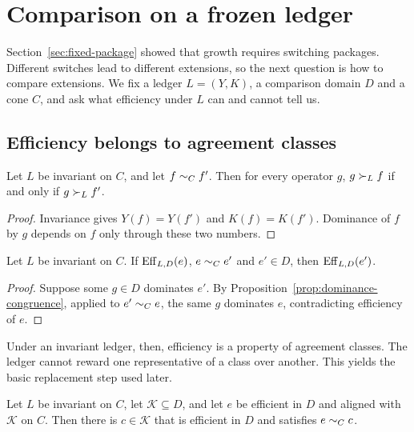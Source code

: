 \section{Comparison on a frozen ledger}\label{sec:frozen-frontier}

Section~\ref{sec:fixed-package} showed that growth requires switching packages. Different switches lead to different extensions, so the next question is how to compare extensions. We fix a ledger $L=(Y,K)$, a comparison domain $D$ and a cone $C$, and ask what efficiency under $L$ can and cannot tell us.

\subsection{Efficiency belongs to agreement classes}

\begin{proposition}\label{prop:dominance-congruence}
Let $L$ be invariant on $C$, and let $f\mathrel{\sim_{C}}f'$. Then for every operator $g$, $g\succ_L f$ if and only if $g\succ_L f'$.
\end{proposition}

\begin{proof}
Invariance gives $Y(f)=Y(f')$ and $K(f)=K(f')$. Dominance of $f$ by $g$ depends on $f$ only through these two numbers.
\end{proof}

\begin{theorem}\label{thm:efficiency-transfer}
Let $L$ be invariant on $C$. If $\operatorname{Eff}_{L,D}(e)$, $e\mathrel{\sim_{C}}e'$ and $e'\in D$, then $\operatorname{Eff}_{L,D}(e')$.
\end{theorem}

\begin{proof}
Suppose some $g\in D$ dominates $e'$. By Proposition~\ref{prop:dominance-congruence}, applied to $e'\mathrel{\sim_{C}}e$, the same $g$ dominates $e$, contradicting efficiency of $e$.
\end{proof}

Under an invariant ledger, then, efficiency is a property of agreement classes. The ledger cannot reward one representative of a class over another. This yields the basic replacement step used later.

\begin{lemma}\label{lem:restricted-alignment}
Let $L$ be invariant on $C$, let $\mathcal{K}\subseteq D$, and let $e$ be efficient in $D$ and aligned with $\mathcal{K}$ on $C$. Then there is $c\in\mathcal{K}$ that is efficient in $D$ and satisfies $e\mathrel{\sim_{C}}c$.
\end{lemma}

